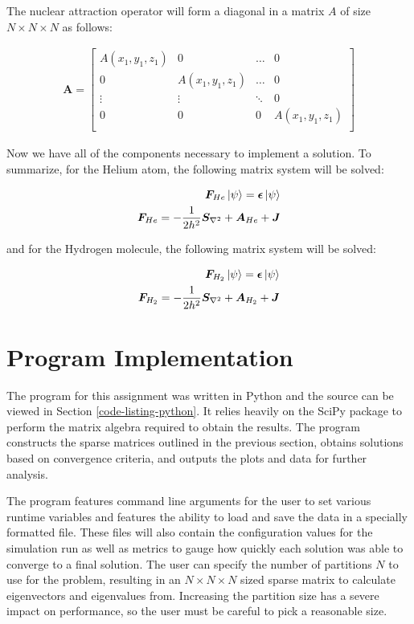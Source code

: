 \documentclass[10pt, oneside, letterpaper]{article}
\begin{document}
The nuclear attraction operator will form a diagonal in a matrix $A$ of size $N \times N \times N$ as follows:

\begin{align*}
\bm{A} =
\begin{bmatrix}
 A(x_1, y_1, z_1) & 0 & \hdots & 0\\
 0 &  A(x_1, y_1, z_1) & \hdots & 0\\
 \vdots & \vdots & \ddots & 0\\
 0 & 0 & 0 &  A(x_1, y_1, z_1)\\
\end{bmatrix}
\end{align*}

Now we have all of the components necessary to implement a solution. To summarize, for the Helium atom, the following matrix system will be solved:

\begin{align*}
  \bm{F}_{He}\ket{\psi} = \bm{\epsilon}\ket{\psi} \\
  \bm{F}_{He} = -\frac{1}{2h^2}\bm{S}_{\nabla^2} + \bm{A}_{He} + \bm{J}
\end{align*}

and for the Hydrogen molecule, the following matrix system will be solved:

\begin{align*}
  \bm{F}_{H_2}\ket{\psi} = \bm{\epsilon}\ket{\psi} \\
  \bm{F}_{H_2} = -\frac{1}{2h^2}\bm{S}_{\nabla^2} + \bm{A}_{H_2} + \bm{J}
\end{align*}

\newpage
\section{Program Implementation}

The program for this assignment was written in Python and the source can be viewed in Section \ref{code-listing-python}. It relies heavily on the SciPy package to perform the matrix algebra required to obtain the results. The program constructs the sparse matrices outlined in the previous section, obtains solutions based on convergence criteria, and outputs the plots and data for further analysis.

The program features command line arguments for the user to set various runtime variables and features the ability to load and save the data in a specially formatted file. These files will also contain the configuration values for the simulation run as well as metrics to gauge how quickly each solution was able to converge to a final solution. The user can specify the number of partitions $N$ to use for the problem, resulting in an $N \times N \times N$ sized sparse matrix to calculate eigenvectors and eigenvalues from. Increasing the partition size has a severe impact on performance, so the user must be careful to pick a reasonable size.
\end{document}
